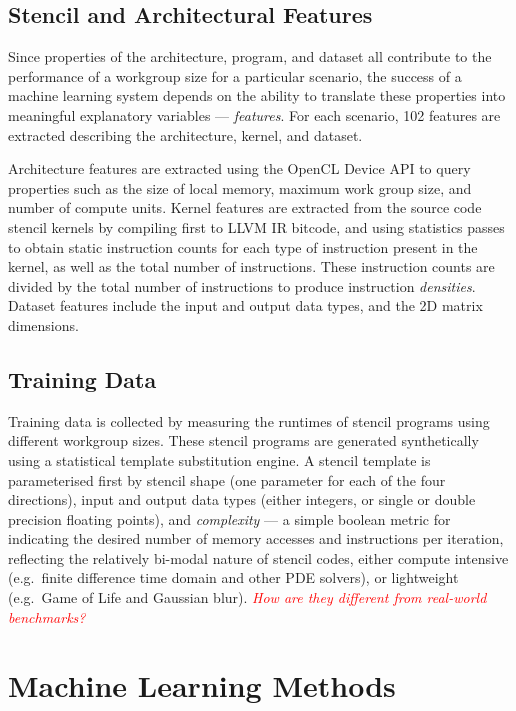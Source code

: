 \documentclass[preprint,nonatbib,10pt,nocopyrightspace]{sigplanconf}
\newcommand{\fix}[1]{\textcolor{red}{\em\footnotesize#1}}
\begin{document}
\subsection{Stencil and Architectural Features}

Since properties of the architecture, program, and dataset all
contribute to the performance of a workgroup size for a particular
scenario, the success of a machine learning system depends on the
ability to translate these properties into meaningful explanatory
variables --- \emph{features}. For each scenario, 102 features are
extracted describing the architecture, kernel, and dataset.

Architecture features are extracted using the OpenCL Device API to
query properties such as the size of local memory, maximum work group
size, and number of compute units. Kernel features are extracted from
the source code stencil kernels by compiling first to LLVM IR bitcode,
and using statistics passes to obtain static instruction counts for
each type of instruction present in the kernel, as well as the total
number of instructions. These instruction counts are divided by the
total number of instructions to produce instruction
\emph{densities}. Dataset features include the input and output data
types, and the 2D matrix dimensions.


\subsection{Training Data}\label{subsec:training}

Training data is collected by measuring the runtimes of stencil
programs using different workgroup sizes. These stencil programs are
generated synthetically using a statistical template substitution
engine. A stencil template is parameterised first by stencil shape
(one parameter for each of the four directions), input and output data
types (either integers, or single or double precision floating
points), and \emph{complexity} --- a simple boolean metric for
indicating the desired number of memory accesses and instructions per
iteration, reflecting the relatively bi-modal nature of stencil codes,
either compute intensive (e.g.\ finite difference time domain and
other PDE solvers), or lightweight (e.g.\ Game of Life and Gaussian
blur). \fix{How are they different from real-world benchmarks?}


\section{Machine Learning Methods}\label{sec:ml}
\end{document}
